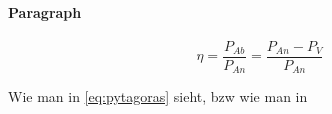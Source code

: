\begin{table}
	\caption{test}
\end{table}

\paragraph{Paragraph}
\label{sec:paragraph}
%
\begin{equation}
	\eta = \dfrac{P_{Ab}}{P_{An}} = \dfrac{P_{An}-P_{V}}{P_{An}}
\end{equation}
%
\begin{Gleichungsparameter}
\end{Gleichungsparameter}

Wie man in \eqref{eq:pytagoras} sieht, bzw wie man in 


